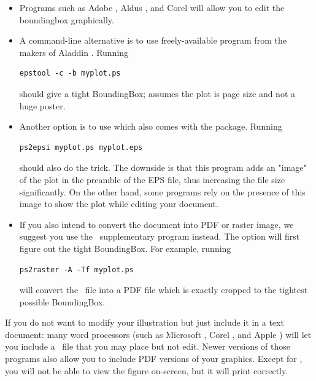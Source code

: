 \begin{itemize}
\item Programs such as Adobe , Aldus
, and Corel  will allow you
to edit the boundingbox graphically.

\item A command-line alternative is to use freely-available program  from the makers of Aladdin .  Running
\small
\begin{verbatim}
epstool -c -b myplot.ps
\end{verbatim}
\normalsize
should give a tight BoundingBox;  assumes the plot
is page size and not a huge poster.

\item Another option is to use  which also comes with the  package.  Running
\small
\begin{verbatim}
ps2epsi myplot.ps myplot.eps
\end{verbatim}
\normalsize
should also do the trick. The downside is that this program adds an "image" of the plot in the preamble of the EPS file, thus increasing the file size significantly. On the other hand, some programs rely on the presence of this image to show the plot while editing your document.

\item If you also intend to convert the document into PDF or raster image, we suggest you use the \GMT\ supplementary program  instead. The  option will first figure out the tight BoundingBox. For example, running
\small
\begin{verbatim}
ps2raster -A -Tf myplot.ps
\end{verbatim}
\normalsize
will convert the \PS\ file  into a PDF file  which is exactly cropped to the tightest possible BoundingBox.
\end{itemize}

If you do not want to modify your illustration but just include it in a text document: many word processors (such
as Microsoft , Corel , and Apple )
will let you include a \PS\ file that you may place but not edit. Newer versions of those programs also allow you to include PDF versions of your graphics. Except for , 
you will not be able to view the figure on-screen, but it will print correctly.

